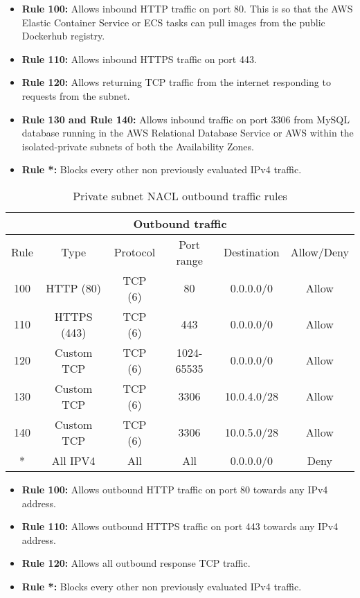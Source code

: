\begin{itemize}
    \item \textbf{Rule 100:} Allows inbound HTTP traffic on port 80. This is so that the AWS Elastic Container Service or ECS tasks can pull images from the public Dockerhub registry.
    \item \textbf{Rule 110:} Allows inbound HTTPS traffic on port 443.
    \item \textbf{Rule 120:} Allows returning TCP traffic from the internet responding to requests from the subnet.
    \item \textbf{Rule 130 and Rule 140:} Allows inbound traffic on port 3306 from MySQL database running in the AWS Relational Database Service or AWS within the isolated-private subnets of both the Availability Zones.
    \item \textbf{Rule *:} Blocks every other non previously evaluated IPv4 traffic.
\end{itemize}

\begin{table}[H]
    \centering
    \begin{tabular}{|c|c|c|c|c|c|}
        \hline
        \multicolumn{6}{|c|}{Outbound traffic}                                \\
        \hline
        Rule & Type        & Protocol & Port range & Destination & Allow/Deny \\
        \hline
        100  & HTTP (80)   & TCP (6)  & 80         & 0.0.0.0/0   & Allow      \\
        \hline
        110  & HTTPS (443) & TCP (6)  & 443        & 0.0.0.0/0   & Allow      \\
        \hline
        120  & Custom TCP  & TCP (6)  & 1024-65535 & 0.0.0.0/0   & Allow      \\
        \hline
        130  & Custom TCP  & TCP (6)  & 3306       & 10.0.4.0/28 & Allow      \\
        \hline
        140  & Custom TCP  & TCP (6)  & 3306       & 10.0.5.0/28 & Allow      \\
        \hline
        *    & All IPV4    & All      & All        & 0.0.0.0/0   & Deny       \\
        \hline
    \end{tabular}
    \caption{Private subnet NACL outbound traffic rules}
    \label{table:private-subnet-outbound}
\end{table}

\begin{itemize}
    \item \textbf{Rule 100:} Allows outbound HTTP traffic on port 80 towards any IPv4 address.
    \item \textbf{Rule 110:} Allows outbound HTTPS traffic on port 443 towards any IPv4 address.
    \item \textbf{Rule 120:} Allows all outbound response TCP traffic.
    \item \textbf{Rule *:} Blocks every other non previously evaluated IPv4 traffic.
\end{itemize}

